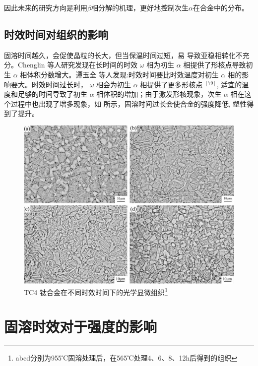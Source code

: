 \documentclass[
class = book,
zihao = -4,
font = noto,
paper = a4paper,
openany
]{easybook}
\begin{document}
因此未来的研究方向是利用$ \beta $相分解的机理，更好地控制次生$ \alpha $在合金中的分布。
\newpage
\section{时效时间对组织的影响}
固溶时间越久，会促使晶粒的长大，但当保温时间过短，易 导致亚稳相转化不充分\cite{renchiqiangGurongshixiaoduiTC4taihejinxianweizuzhihelixuexingnengdeyingxiang2022}。Chenglin \cite{liPhaseTransformationAge2013} 等人研究发现在长时间的时效 $\omega$ 相为初生 $\alpha$ 相提供了形核点导致初生 $\alpha$ 相体积分数增大。谭玉全\cite{tanyuquanRechuliduiTC4taihejinzuzhiXingnengdeyingxiangjicanyuyinglixiaochufangfadeyanjiu2016} 等人发现:时效时间要比时效温度对初生 $\alpha$ 相的影响要大。时效时间过长时， $\omega$ 相会为初生 $\alpha$ 相提供了更多形核点 ${ }^{[79]}$, 适宜的温度和足够的时间导致了初生 $\alpha$ 相体积的增加；由于激发形核现象，次生 $\alpha$ 相在这个过程中也出现了增多现象，如 所示，固溶时间过长会使合金的强度降低, 塑性得到了提升。
\begin{figure}[h!]
	\centering
	\includegraphics[width=0.7\linewidth]{"TC4 钛合金在不同时效时间下的光学显微组织"}
	\caption{TC4 钛合金在不同时效时间下的光学显微组织\footnote{abcd分别为955℃固溶处理后，在565℃处理4、6、8、12h后得到的组织}}
	\label{fig:tc4time}
\end{figure}



\chapter{固溶时效对于强度的影响}
\end{document}
